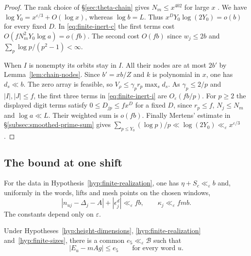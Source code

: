 \begin{proof}
The rank choice of \S\ref{sec:theta-chain} gives $N_m\le x^{402}$
for large $x$ \citep[Lemma~16.10]{adriazola-grh}.
We have $\log Y_0=x^{\varepsilon/3}+O(\log x)$, whereas $\log b=L$.
Thus $x^D Y_0\log(2Y_0)=o(b)$ for every fixed $D$.
In \eqref{eq:finite-inert-c} the first terms cost
$O(fN_m^2Y_0\log a)=o(fb)$. The second cost $O(fb)$ since
$w_j\le2b$ and $\sum_{p}\log p/(p^2-1)<\infty$.

When $I$ is nonempty its orbits stay in $I$. All their nodes are
at most $2b'$ by Lemma~\ref{lem:chain-nodes}. Since $b'=xb/Z$ and
$k$ is polynomial in $x$, one has $d_s\ll b$. The zero array is
feasible, so $V_\rho\le\gamma_p r_p\max_s d_s$. As
$\gamma_p\le2/p$ and $|I|,|J|\le f$, the first three terms in
\eqref{eq:finite-inert-i} are $O_\varepsilon(fb/p)$. For $p\ge2$
the displayed digit terms satisfy $0\le D_{jp}\le fx^{D}$ for a
fixed $D$, since $r_p\le f$, $N_j\le N_m$ and $\log a\ll L$.
Their weighted sum is $o(fb)$. Finally Mertens' estimate in
\S\ref{subsec:smoothed-prime-sum} gives
$\sum_{p\le Y_0}(\log p)/p\ll\log(2Y_0)\ll_\varepsilon x^{\varepsilon/3}$.
\end{proof}

\subsection{The bound at one shift}

\begin{hypothesis}[\openinput]\label{hyp:finite-sizes}
For the data in Hypothesis~\ref{hyp:finite-realization}, one has
$\eta+S_c\ll_\varepsilon b$ and, uniformly in the words, lifts and
mesh points on the chosen windows,
\[
 |n_{uj}-\Delta_j-A|+|\epsilon_j^d|\ll_\varepsilon fb,\qquad
 \kappa_j\ll_\varepsilon fmb .
\]
The constants depend only on $\varepsilon$.
\end{hypothesis}

\begin{theorem}\label{thm:finite-correction}
Under Hypotheses~\ref{hyp:height-dimensions},
\ref{hyp:finite-realization} and~\ref{hyp:finite-sizes}, there is
a common $e_5\ll_\varepsilon\mathcal B$ such that
\[
                 |E_u-mAg|\le e_5\qquad\text{for every word }u .
\]
\end{theorem}

